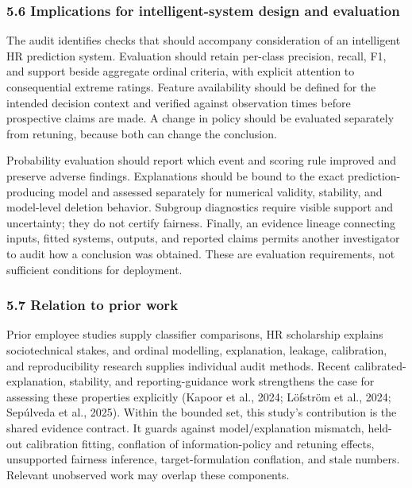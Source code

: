 \documentclass[
  a4paper,
  review]{elsarticle}
\begin{document}
\subsubsection{5.6 Implications for intelligent-system design and
evaluation}\label{implications-for-intelligent-system-design-and-evaluation}

The audit identifies checks that should accompany consideration of an
intelligent HR prediction system. Evaluation should retain per-class
precision, recall, F1, and support beside aggregate ordinal criteria,
with explicit attention to consequential extreme ratings. Feature
availability should be defined for the intended decision context and
verified against observation times before prospective claims are made. A
change in policy should be evaluated separately from retuning, because
both can change the conclusion.

Probability evaluation should report which event and scoring rule
improved and preserve adverse findings. Explanations should be bound to
the exact prediction-producing model and assessed separately for
numerical validity, stability, and model-level deletion behavior.
Subgroup diagnostics require visible support and uncertainty; they do
not certify fairness. Finally, an evidence lineage connecting inputs,
fitted systems, outputs, and reported claims permits another
investigator to audit how a conclusion was obtained. These are
evaluation requirements, not sufficient conditions for deployment.

\subsubsection{5.7 Relation to prior work}\label{relation-to-prior-work}

Prior employee studies supply classifier comparisons, HR scholarship
explains sociotechnical stakes, and ordinal modelling, explanation,
leakage, calibration, and reproducibility research supplies individual
audit methods. Recent calibrated-explanation, stability, and
reporting-guidance work strengthens the case for assessing these
properties explicitly (Kapoor et al., 2024; Löfström et al., 2024;
Sepúlveda et al., 2025). Within the bounded set, this study's
contribution is the shared evidence contract. It guards against
model/explanation mismatch, held-out calibration fitting, conflation of
information-policy and retuning effects, unsupported fairness inference,
target-formulation conflation, and stale numbers. Relevant unobserved
work may overlap these components.
\end{document}
